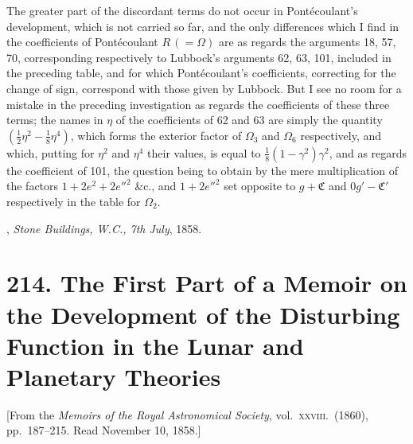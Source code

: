 \documentclass[12pt,a4paper]{article}
\theoremstyle{plain}
\begin{document}
\medskip

The greater part of the discordant terms do not occur in Pont\'ecoulant's development, which is not carried so far, and the only differences which I find in the coefficients of Pont\'ecoulant $R\,(=\Omega)$ are as regards the arguments 18, 57, 70, corresponding respectively to Lubbock's arguments 62, 63, 101, included in the preceding table, and for which Pont\'ecoulant's coefficients, correcting for the change of sign, correspond with those given by Lubbock. But I see no room for a mistake in the preceding investigation as regards the coefficients of these three terms; the names in $\eta$ of the coefficients of 62 and 63 are simply the quantity $(\tfrac{1}{2}\eta^{2}-\tfrac{1}{8}\eta^{4})$, which forms the exterior factor of $\Omega_{3}$ and $\Omega_{6}$ respectively, and which, putting for $\eta^{2}$ and $\eta^{4}$ their values, is equal to $\tfrac{1}{8}(1-\gamma^{2})\gamma^{2}$, and as regards the coefficient of 101, the question being to obtain by the mere multiplication of the factors $1+2e^{2}+2e''^{2}$ \&c., and $1+2e''^{2}$ set opposite to $g+\mathfrak{C}$ and $0g'-\mathfrak{C}'$ respectively in the table for $\Omega_{2}$.

\bigskip

, \textit{Stone Buildings, W.C., 7th July}, 1858.


\newpage
{}

\section*{214. The First Part of a Memoir on the Development of the Disturbing Function in the Lunar and Planetary Theories}

\begin{center}
[From the \textit{Memoirs of the Royal Astronomical Society}, vol.~\textsc{xxviii}.\ (1860), pp.~187--215. Read November 10, 1858.]
\end{center}

\medskip
\end{document}
